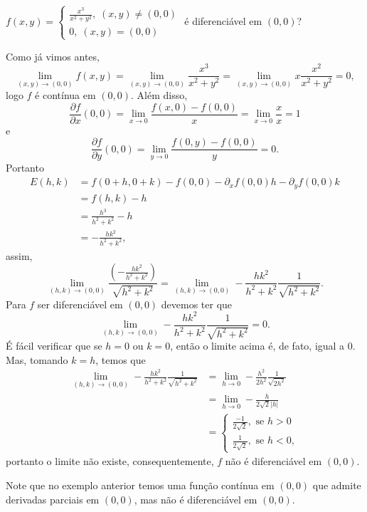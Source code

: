 \begin{example}
    \(f(x,y) = \begin{cases}
        \frac{x^3}{x^2+y^2},\; (x,y)\neq(0,0) \\
        0,\; (x,y)=(0,0)
    \end{cases}\) é diferenciável em \((0,0)\)?

    Como já vimos antes, \[\lim_{(x,y)\to(0,0)} f(x,y) = \lim_{(x,y)\to(0,0)} \frac{x^3}{x^2 + y^2} = \lim_{(x,y)\to(0,0)} x \frac{x^2}{x^2+y^2} = 0,\] logo \(f\) é contínua em \((0,0)\). Além disso,
    \[\frac{\partial f}{\partial x}(0,0) = \lim_{x\to 0} \frac{f(x,0)-f(0,0)}{x} = \lim_{x\to 0} \frac{x}{x} = 1\] e \[\frac{\partial f}{\partial y}(0,0) = \lim_{y\to 0} \frac{f(0,y)-f(0,0)}{y} = 0.\] Portanto
        \begin{align*}
            E(h,k)
                & = f(0+h,0+k) - f(0,0) - \partial_x f(0,0) h - \partial_y f(0,0) k \\
                & = f(h,k) - h \\
                & = \frac{h^3}{h^2 + k^2} - h \\
                & = -\frac{hk^2}{h^2+k^2},
        \end{align*}
    assim, \[\lim_{(h,k)\to(0,0)} \frac{\left( -\frac{hk^2}{h^2+k^2} \right)}{\sqrt{h^2 + k^2}} = \lim_{(h,k)\to(0,0)} -\frac{hk^2}{h^2+k^2}\frac{1}{\sqrt{h^2+k^2}}.\] Para \(f\) ser diferenciável em \((0,0)\) devemos ter que \[\lim_{(h,k)\to(0,0)} -\frac{hk^2}{h^2+k^2}\frac{1}{\sqrt{h^2+k^2}} = 0.\] É fácil verificar que se \(h=0\) ou \(k=0\), então o limite acima é, de fato, igual a \(0\). Mas, tomando \(k=h\), temos que
        \begin{align*}
            \lim_{(h,k)\to(0,0)} -\frac{hk^2}{h^2+k^2}\frac{1}{\sqrt{h^2+k^2}} 
                & = \lim_{h\to 0} -\frac{h^2}{2h^2}\frac{1}{\sqrt{2h^2}} \\
                & = \lim_{h\to 0} - \frac{h}{2\sqrt{2}|h|} \\
                & = \begin{cases}
        \frac{-1}{2\sqrt{2}}, \text{ se } h>0\\
        \frac{1}{2\sqrt{2}}, \text{ se } h<0,
    \end{cases}
        \end{align*}
    portanto o limite não existe, consequentemente, \(f\) não é diferenciável em \((0,0)\).
\end{example}

\begin{remark}
    Note que no exemplo anterior temos uma função contínua em \((0,0)\) que admite derivadas parciais em \((0,0)\), mas não é diferenciável em \((0,0)\).
\end{remark}

